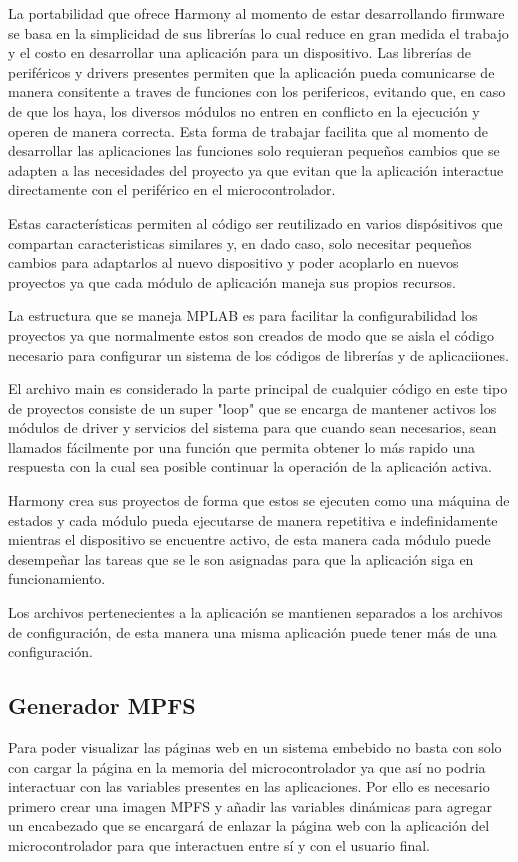\documentclass[letterpaper,12pt,oneside]{book}
\begin{document}
			La portabilidad que ofrece Harmony al momento de estar desarrollando firmware se basa en la simplicidad de sus librerías lo cual reduce en gran medida el trabajo y el costo en desarrollar una aplicación para un dispositivo. Las librerías de periféricos y drivers presentes permiten que la aplicación pueda comunicarse de manera consitente a traves de funciones con los perifericos, evitando que, en caso de que los haya, los diversos módulos no entren en conflicto en la ejecución y operen de manera correcta. Esta forma de trabajar facilita que al momento de desarrollar las aplicaciones las funciones solo requieran pequeños cambios que se adapten a las necesidades del proyecto ya que evitan que la aplicación interactue directamente con el periférico en el microcontrolador.

			Estas características permiten al código ser reutilizado en varios dispósitivos que compartan caracteristicas similares y, en dado caso, solo necesitar pequeños cambios para adaptarlos al nuevo dispositivo y poder acoplarlo en nuevos proyectos ya que cada módulo de aplicación maneja sus propios recursos.

			La estructura que se maneja MPLAB es para facilitar la configurabilidad los proyectos ya que normalmente estos son creados de modo que se aisla el código necesario para configurar un sistema de los códigos de librerías y de aplicaciiones.

			El archivo main es considerado la parte principal de cualquier código en este tipo de proyectos consiste de un super "loop" que se encarga de mantener activos los módulos de driver y servicios del sistema para que cuando sean necesarios, sean llamados fácilmente por una función que permita obtener lo más rapido una respuesta con la cual sea posible continuar la operación de la aplicación activa. 

			Harmony crea sus proyectos de forma que estos se ejecuten como una máquina de estados y cada módulo pueda ejecutarse de manera repetitiva e indefinidamente mientras el dispositivo se encuentre activo, de esta manera cada módulo puede desempeñar las tareas que se le son asignadas para que la aplicación siga en funcionamiento.

			Los archivos pertenecientes a la aplicación se mantienen separados a los archivos de configuración, de esta manera una misma aplicación puede tener más de una configuración.

			\subsection{Generador MPFS}
			Para poder visualizar las páginas web en un sistema embebido no basta con solo con cargar la página en la memoria del microcontrolador ya que así no podria interactuar con las variables presentes en las aplicaciones. Por ello es necesario primero crear una imagen MPFS y añadir las variables dinámicas para agregar un encabezado que se encargará de enlazar la página web con la aplicación del microcontrolador para que interactuen entre sí y con el usuario final.
\end{document}
